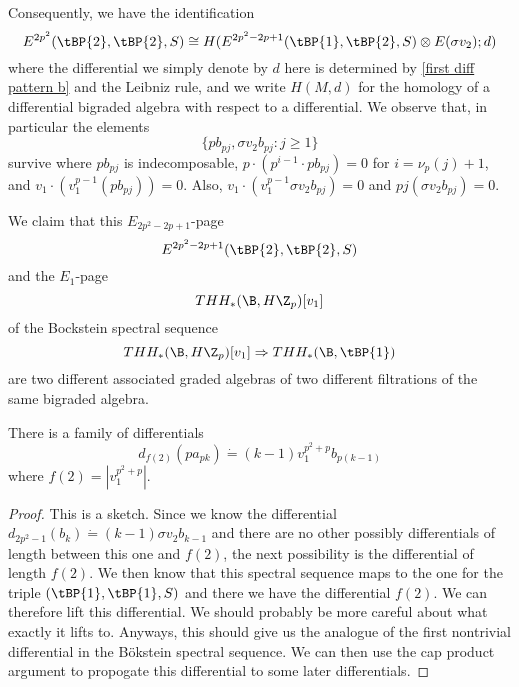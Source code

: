 Consequently, we have the identification 
\[ E^{2p^2}(\tBP{2},\tBP{2},S)\cong H( E^{2p^2-2p+1}(\tBP{1},\tBP{2},S)\otimes E(\sigma v_2) ; d) \]
where the differential we simply denote by $d$ here is determined by \eqref{first diff pattern b} and the Leibniz rule, and we write $H(M,d)$ for the homology of a differential bigraded algebra with respect to a differential. We observe that, in particular the elements 
\[ \{ pb_{pj}, \sigma v_2 b_{pj} : j\ge 1\} \]
survive where $pb_{pj}$ is indecomposable, $p\cdot (p^{i-1}\cdot pb_{pj})=0$ for $i=\nu_p(j)+1$, and $v_1\cdot (v_1^{p-1}(pb_{pj}))=0$. Also,  $v_1\cdot (v_1^{p-1}\sigma v_2 b_{pj})=0$ and $pj(\sigma v_2 b_{pj})=0$.
 
We claim that this $E_{2p^2-2p+1}$-page 
\[E^{2p^2-2p+1}(\tBP{2},\tBP{2},S)\]
and the $E_1$-page  
\[THH_*(\B,H\Z_p)[v_1]\] 
of the Bockstein spectral sequence 
\[ THH_*(\B,H\Z_p)[v_1]\Rightarrow THH_*(\B,\tBP{1})\]
are two different associated graded algebras of two different filtrations of the same bigraded algebra. 

\begin{prop}\label{third family of d}
There is a family of differentials 
\[ d_{f(2)}(pa_{pk})\dot{=}(k-1)v_1^{p^2+p}b_{p(k-1)}\]
where $f(2)=|v_1^{p^2+p}|$. 
\end{prop}
\begin{proof}
This is a sketch. Since we know the differential $d_{2p^2-1}(b_k)\dot{=}(k-1)\sigma v_2 b_{k-1}$ and there are no other possibly differentials of length between this one and $f(2)$, the next possibility is the differential of length $f(2)$. We then know that this spectral sequence maps to the one for the triple $(\tBP{1},\tBP{1},S)$ and there we have the differential $f(2)$. We can therefore lift this differential. We should probably be more careful about what exactly it lifts to. Anyways, this should give us the analogue of the first nontrivial differential in the B\"okstein spectral sequence. We can then use the cap product argument to propogate this differential to some later differentials. 
\end{proof}

